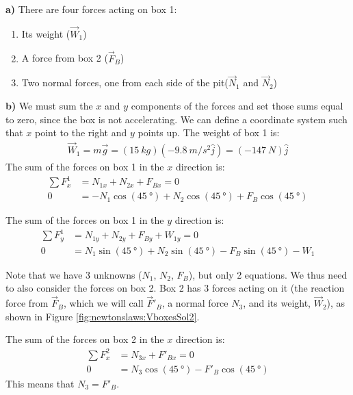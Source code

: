 \begin{solution}
\textbf{a)} There are four forces acting on box 1:
\begin{enumerate}
\item Its weight ($\vec W_1$)
\item A force from box 2 ($\vec F_B$)
\item Two normal forces, one from each side of the pit($\vec N_1$ and $\vec N_2$)
\end{enumerate}
 
\textbf{b)}
We must sum the $x$ and $y$ components of the forces and set those sums equal to zero, since the box is not accelerating. We can define a coordinate system such that $x$ point to the right and $y$ points up. The weight of box 1 is:
\begin{align*}
\vec W_1=m\vec g=(\SI{15}{kg})(\SI{-9.8}{m/s^2}\hat j)=(-\SI{147}{N})\hat j
\end{align*} 
The sum of the forces on box 1 in the $x$ direction is:
\begin{align*}
\sum F_x^1 &= N_{1x}+N_{2x}+F_{Bx} = 0\\
0&= -N_1\cos(\SI{45}{\degree})+N_2\cos(\SI{45}{\degree})+F_B\cos(\SI{45}{\degree})
\end{align*}

The sum of the forces on box 1 in the $y$ direction is:
\begin{align*}
\sum F_y^1 &= N_{1y}+N_{2y}+F_{By}+W_{1y} = 0\\
0&= N_1\sin(\SI{45}{\degree})+N_2\sin(\SI{45}{\degree})-F_B\sin(\SI{45}{\degree})-W_1
\end{align*}

Note that we have 3 unknowns ($N_1$, $N_2$, $F_B$), but only 2 equations. We thus need to also consider the forces on box 2. Box 2 has 3 forces acting on it (the reaction force from $\vec F_B$, which we will call $\vec F'_B$, a normal force $N_3$, and its weight, $\vec W_2$), as shown in Figure \ref{fig:newtonslaws:VboxesSol2}. 

The sum of the forces on box 2 in the $x$ direction is:
\begin{align*}
\sum F_x^2 &= N_{3x}+F'_{Bx} = 0\\
0&= N_3\cos(\SI{45}{\degree})-F'_B\cos(\SI{45}{\degree})
\end{align*}
This means that $N_3=F'_B$.


\end{solution}
